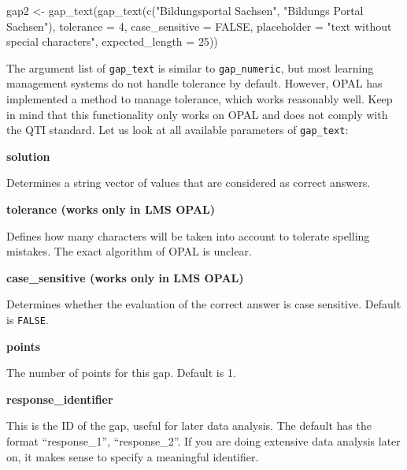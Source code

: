 \documentclass[twoside]{tufte-book}
\newenvironment{Shaded}{}{}
\newcommand{\AttributeTok}[1]{\textcolor[rgb]{0.49,0.56,0.16}{#1}}
\newcommand{\ConstantTok}[1]{\textcolor[rgb]{0.53,0.00,0.00}{#1}}
\newcommand{\DecValTok}[1]{\textcolor[rgb]{0.25,0.63,0.44}{#1}}
\newcommand{\FunctionTok}[1]{\textcolor[rgb]{0.02,0.16,0.49}{#1}}
\newcommand{\NormalTok}[1]{#1}
\newcommand{\OtherTok}[1]{\textcolor[rgb]{0.00,0.44,0.13}{#1}}
\newcommand{\StringTok}[1]{\textcolor[rgb]{0.25,0.44,0.63}{#1}}
\begin{document}
\begin{Shaded}
\begin{Highlighting}[]
\NormalTok{gap2 }\OtherTok{\textless{}{-}} \FunctionTok{gap\_text}\NormalTok{(}\FunctionTok{gap\_text}\NormalTok{(}\FunctionTok{c}\NormalTok{(}\StringTok{"Bildungsportal Sachsen"}\NormalTok{, }\StringTok{"Bildungs Portal Sachsen"}\NormalTok{),}
                          \AttributeTok{tolerance =} \DecValTok{4}\NormalTok{, }\AttributeTok{case\_sensitive =} \ConstantTok{FALSE}\NormalTok{, }
                          \AttributeTok{placeholder =} \StringTok{"text without special characters"}\NormalTok{,}
                          \AttributeTok{expected\_length =} \DecValTok{25}\NormalTok{))}
\end{Highlighting}
\end{Shaded}

The argument list of \texttt{gap\_text} is similar to \texttt{gap\_numeric}, but most learning management systems do not handle tolerance by default. However, OPAL has implemented a method to manage tolerance, which works reasonably well. Keep in mind that this functionality only works on OPAL and does not comply with the QTI standard. Let us look at all available parameters of \texttt{gap\_text}:

\noindent\textbf{solution}\label{solution-1}

Determines a string vector of values that are considered as correct answers.

\noindent\textbf{tolerance (works only in LMS OPAL)}\label{tolerance-works-only-in-lms-opal}

Defines how many characters will be taken into account to tolerate spelling mistakes. The exact algorithm of OPAL is unclear.

\noindent\textbf{case\_sensitive (works only in LMS OPAL)}\label{case_sensitive-works-only-in-lms-opal}

Determines whether the evaluation of the correct answer is case sensitive. Default is \texttt{FALSE}.

\noindent\textbf{points}\label{points-3}

The number of points for this gap. Default is 1.

\noindent\textbf{response\_identifier}\label{response_identifier-1}

This is the ID of the gap, useful for later data analysis. The default has the format ``response\_1'', ``response\_2''. If you are doing extensive data analysis later on, it makes sense to specify a meaningful identifier.
\end{document}

